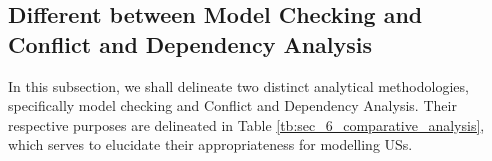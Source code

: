 \subsection*{Different between Model Checking and Conflict and Dependency Analysis}
In this subsection, we shall delineate two distinct analytical methodologies, specifically model checking and Conflict and Dependency Analysis. Their respective purposes are delineated in Table \ref{tb:sec_6_comparative_analysis}, which serves to elucidate their appropriateness for modelling USs.

